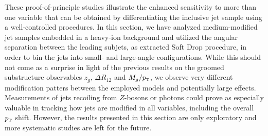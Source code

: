 These proof-of-principle studies illustrate the enhanced sensitivity to more than one variable that can be obtained by differentiating the inclusive jet sample using a well-controlled procedures. 
In this section, we have analyzed medium-modified jet samples embedded in a heavy-ion background and utilized the angular separation between the leading subjets, as extracted Soft Drop procedure, in order to bin the jets into small- and large-angle configurations. While this should not come as a surprise in light of the previous results on the groomed substructure observables $z_g$, $\Delta R_{12}$ and $M_g/p_{\text{\tiny T}}$, we observe very different modification patters between the employed models and potentially large effects. Measurements of jets recoiling from $Z$-bosons or photons could prove as especially valuable in tracking how jets are modified in all variables, including the overall $p_{\text{\tiny T}}$ shift.
However, the results presented in this section are only exploratory and more systematic studies are left for the future.
